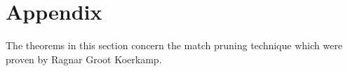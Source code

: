 \section{Appendix} \label{GLOBALsec:appendix}

The theorems in this section concern the match pruning technique which were
proven by Ragnar Groot Koerkamp.



